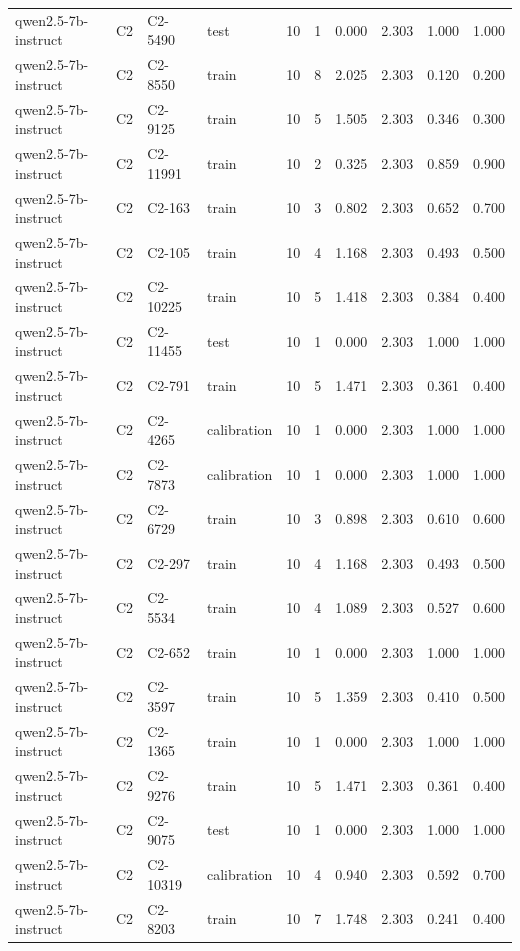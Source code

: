\begin{table}
\begin{tabular}{llllrrrrrr}
qwen2.5-7b-instruct & C2 & C2-5490 & test & 10 & 1 & 0.000 & 2.303 & 1.000 & 1.000 \\
qwen2.5-7b-instruct & C2 & C2-8550 & train & 10 & 8 & 2.025 & 2.303 & 0.120 & 0.200 \\
qwen2.5-7b-instruct & C2 & C2-9125 & train & 10 & 5 & 1.505 & 2.303 & 0.346 & 0.300 \\
qwen2.5-7b-instruct & C2 & C2-11991 & train & 10 & 2 & 0.325 & 2.303 & 0.859 & 0.900 \\
qwen2.5-7b-instruct & C2 & C2-163 & train & 10 & 3 & 0.802 & 2.303 & 0.652 & 0.700 \\
qwen2.5-7b-instruct & C2 & C2-105 & train & 10 & 4 & 1.168 & 2.303 & 0.493 & 0.500 \\
qwen2.5-7b-instruct & C2 & C2-10225 & train & 10 & 5 & 1.418 & 2.303 & 0.384 & 0.400 \\
qwen2.5-7b-instruct & C2 & C2-11455 & test & 10 & 1 & 0.000 & 2.303 & 1.000 & 1.000 \\
qwen2.5-7b-instruct & C2 & C2-791 & train & 10 & 5 & 1.471 & 2.303 & 0.361 & 0.400 \\
qwen2.5-7b-instruct & C2 & C2-4265 & calibration & 10 & 1 & 0.000 & 2.303 & 1.000 & 1.000 \\
qwen2.5-7b-instruct & C2 & C2-7873 & calibration & 10 & 1 & 0.000 & 2.303 & 1.000 & 1.000 \\
qwen2.5-7b-instruct & C2 & C2-6729 & train & 10 & 3 & 0.898 & 2.303 & 0.610 & 0.600 \\
qwen2.5-7b-instruct & C2 & C2-297 & train & 10 & 4 & 1.168 & 2.303 & 0.493 & 0.500 \\
qwen2.5-7b-instruct & C2 & C2-5534 & train & 10 & 4 & 1.089 & 2.303 & 0.527 & 0.600 \\
qwen2.5-7b-instruct & C2 & C2-652 & train & 10 & 1 & 0.000 & 2.303 & 1.000 & 1.000 \\
qwen2.5-7b-instruct & C2 & C2-3597 & train & 10 & 5 & 1.359 & 2.303 & 0.410 & 0.500 \\
qwen2.5-7b-instruct & C2 & C2-1365 & train & 10 & 1 & 0.000 & 2.303 & 1.000 & 1.000 \\
qwen2.5-7b-instruct & C2 & C2-9276 & train & 10 & 5 & 1.471 & 2.303 & 0.361 & 0.400 \\
qwen2.5-7b-instruct & C2 & C2-9075 & test & 10 & 1 & 0.000 & 2.303 & 1.000 & 1.000 \\
qwen2.5-7b-instruct & C2 & C2-10319 & calibration & 10 & 4 & 0.940 & 2.303 & 0.592 & 0.700 \\
qwen2.5-7b-instruct & C2 & C2-8203 & train & 10 & 7 & 1.748 & 2.303 & 0.241 & 0.400 \\

\end{tabular}
\end{table}
